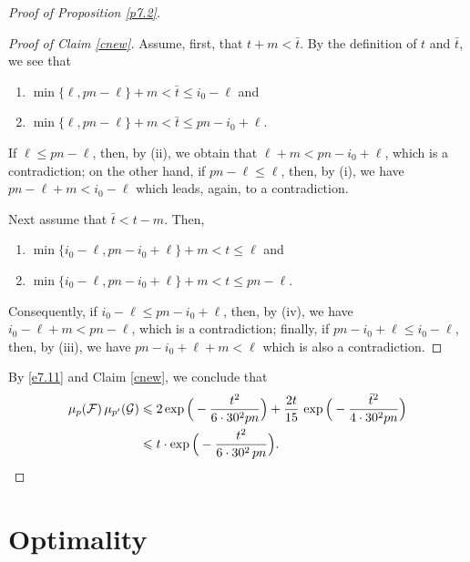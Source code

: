 \documentclass[10pt,a4paper]{amsart}
\theoremstyle{remark}
\newcommand{\mik}{\leqslant}
\newcommand{\Fcal}{\mathcal{F}}
\newcommand{\Gcal}{\mathcal{G}}
\begin{document}
\begin{proof}[Proof of Proposition \emph{\ref{p7.2}}]
\begin{proof}[Proof of Claim \emph{\ref{cnew}}]
Assume, first, that $t+m<\bar{t}$. By the definition of $t$ and $\bar{t}$, we see that
\begin{enumerate}
\item[(i)] $\min\{\ell, pn-\ell\} +m < \bar{t} \mik i_0-\ell$ and
\item[(ii)] $\min\{\ell, pn-\ell\} +m < \bar{t} \mik pn-i_0+\ell$.
\end{enumerate}
If $\ell\mik pn-\ell$, then, by (ii), we obtain that $\ell+m<pn-i_0+\ell$, which is a contradiction; on the other hand,
if $pn-\ell\mik \ell$, then, by (i), we have $pn-\ell+m<i_0-\ell$ which leads, again, to a contradiction.

Next assume that $\bar{t}<t-m$. Then,
\begin{enumerate}
\item[(iii)] $\min\{i_0-\ell, pn-i_0+\ell\} +m < t\mik \ell$ and
\item[(iv)] $\min\{i_0-\ell, pn-i_0+\ell\} +m  < t \mik pn-\ell$.
\end{enumerate}
Consequently, if $i_0-\ell\mik pn-i_0+\ell$, then, by (iv), we have $i_0-\ell+m< pn-\ell$, which is a contradiction;
finally, if $pn-i_0+\ell\mik i_0-\ell$, then, by (iii), we have $pn-i_0+\ell+m<\ell$ which is also a contradiction.
\end{proof}
By \eqref{e7.11} and Claim \ref{cnew}, we conclude that
\begin{align}
\label{e7.12} \mu_p(\Fcal)\, \mu_{p'}(\Gcal) & \mik 2\exp\Big(- \frac{t^2}{6\cdot 30^2pn}\Big) +
\frac{2t}{15}\,  \exp\Big(- \frac{\bar{t}^2}{4\cdot 30^2 pn}\Big) \\
& \mik t\cdot \exp\Big( - \frac{t^2}{6\cdot 30^2\, pn}\Big). \nonumber \qedhere
\end{align}
\end{proof}


\section{Optimality} \label{sec8}

\end{document}
